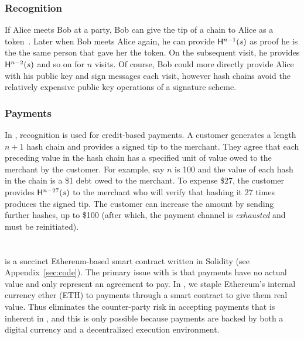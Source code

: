 \subsubsection{Recognition}

 If Alice meets Bob at a party, Bob can give the tip of a chain to Alice as a token~\cite{ABC+98}. Later when Bob meets Alice again, he can provide $\mathsf{H}^{n-1}(s)$ as proof he is the the same person that gave her the token. On the subsequent visit, he provides $\mathsf{H}^{n-2}(s)$ and so on for $n$ visits. Of course, Bob could more directly provide Alice with his public key and sign messages each visit, however hash chains avoid the relatively expensive public key operations of a signature scheme. 

\subsubsection{Payments}

In \pw, recognition is used for credit-based payments. A customer generates a length $n+1$ hash chain and provides a signed tip to the merchant. They agree that each preceding value in the hash chain has a specified unit of value owed to the merchant by the customer. For example, say $n$ is 100 and the value of each hash in the chain is a \$1 debt owed to the merchant. To expense \$27, the customer provides $\mathsf{H}^{n-27}(s)$ to the merchant who will verify that hashing it 27 times produces the signed tip. The customer can increase the amount by sending further hashes, up to \$100 (after which, the payment channel is \textit{exhausted} and must be reinitiated).


\section{\ew}

\ew is a succinct Ethereum-based smart contract written in Solidity (see Appendix~\ref{sec:code}). The primary issue with \pw is that payments have no actual value and only represent an agreement to pay. In \ew, we staple Ethereum's internal currency ether (ETH) to payments through a smart contract to give them real value. Thus \ew eliminates the counter-party risk in accepting payments that is inherent in \pw, and this is only possible because payments are backed by both a digital currency and a decentralized execution environment.

